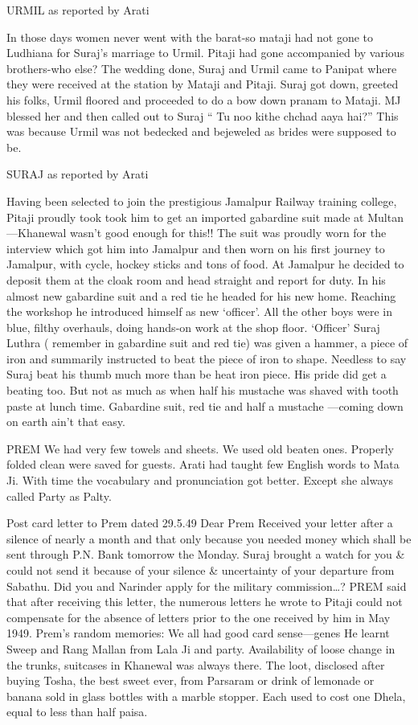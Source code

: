 URMIL as reported by Arati 

In those days women never went with the barat-so mataji had not gone to Ludhiana for Suraj’s marriage to Urmil. Pitaji had gone accompanied by various brothers-who else? The wedding done, Suraj and Urmil came to Panipat where they were received at the station by Mataji and Pitaji. Suraj got down, greeted his folks, Urmil floored and proceeded to do a bow down pranam to Mataji. MJ blessed her and then called out to Suraj “ Tu noo kithe chchad aaya hai?” This was because Urmil was not bedecked and bejeweled as brides were supposed to be. 

SURAJ as reported by Arati

Having been selected to join the prestigious Jamalpur Railway training college, Pitaji proudly took took him to get an imported gabardine suit made at Multan—Khanewal wasn’t good enough for this!! The suit was proudly worn for the interview which got him into Jamalpur and then worn on his first journey to Jamalpur, with cycle, hockey sticks and tons of food. 
At Jamalpur he decided to deposit them at the cloak room and head straight and report for duty. In his almost new gabardine suit and a red tie he headed for his new home. 
Reaching the workshop he introduced himself as new ‘officer’. All the other boys were in blue, filthy overhauls, doing hands-on work at the shop floor. ‘Officer’ Suraj Luthra ( remember in gabardine suit and red tie) was given a hammer, a piece of iron and summarily instructed to beat the piece of iron to shape. Needless to say Suraj beat his thumb much more than be heat iron piece. His pride did get a beating too. But not as much as when half his mustache was shaved with tooth paste at lunch time. Gabardine suit, red tie and half a mustache —coming down on earth ain’t that easy. 

PREM
We had very few towels and sheets. We used old beaten ones. Properly folded clean were saved for guests. 
Arati had taught few English words to Mata Ji. With time the vocabulary and pronunciation got better. Except she always called Party as Palty. 

Post card letter to Prem dated 29.5.49
Dear Prem
Received your letter after a silence of nearly a month and that only because you needed money which shall be sent through P.N. Bank tomorrow the Monday. Suraj brought a watch for you & could not send it because of your silence & uncertainty of your departure from Sabathu. 
Did you and Narinder apply for the military commission…? 
PREM said that after receiving this letter, the numerous letters he wrote to Pitaji could not compensate for the absence of letters prior to the one received by him in May 1949. 
Prem’s random memories:
We all had good card sense—genes
He learnt Sweep and Rang Mallan from Lala Ji and party. 
Availability of loose change in the trunks, suitcases in Khanewal was always there. The loot, disclosed after buying Tosha, the best sweet ever, from Parsaram or drink of lemonade or banana sold in glass bottles with a marble stopper. Each used to cost one Dhela, equal to less than half paisa. 

